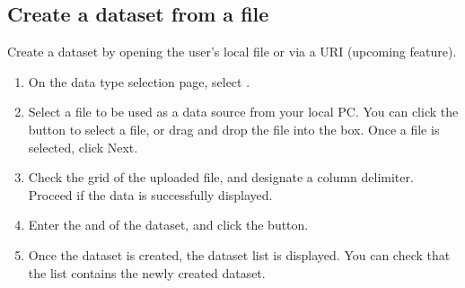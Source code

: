 \documentclass[letterpaper,10pt,english]{sphinxmanual}
\begin{document}
\subsection{Create a dataset from a file}
\label{\detokenize{discovery/part07/create_a_dataset:create-a-dataset-of-file}}\label{\detokenize{discovery/part07/create_a_dataset:id2}}
Create a dataset by opening the user’s local file or via a URI (upcoming feature).
\begin{enumerate}
\def\theenumi{\arabic{enumi}}
\def\labelenumi{\theenumi .}
\makeatletter\def\p@enumii{\p@enumi \theenumi .}\makeatother
\item {} 
On the data type selection page, select .

\item {} 
Select a file to be used as a data source from your local PC. You can click the  button to select a file, or drag and drop the file into the box. Once a file is selected, click Next.
\begin{quote}

\begin{figure}[H]
\centering

\noindent{}
\end{figure}
\end{quote}

\item {} 
Check the grid of the uploaded file, and designate a column delimiter. Proceed if the data is successfully displayed.
\begin{quote}

\begin{figure}[H]
\centering

\noindent{}
\end{figure}
\end{quote}

\item {} 
Enter the  and  of the dataset, and click the  button.
\begin{quote}

\begin{figure}[H]
\centering

\noindent{}
\end{figure}
\end{quote}

\item {} 
Once the dataset is created, the dataset list is displayed. You can check that the list contains the newly created dataset.
\begin{quote}

\begin{figure}[H]
\centering

\noindent{}
\end{figure}
\end{quote}

\end{enumerate}
\end{document}
